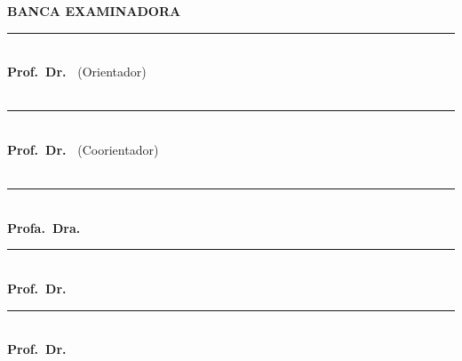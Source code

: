 \begin{center}
    \textbf{BANCA EXAMINADORA}\\

    \vspace{1cm}
    
    \rule{8cm}{0.5pt}\\
    \textbf{Prof.\ Dr.\ \orientador} (Orientador)\\
    \instituicao\ 
    
     \vspace{1cm}
    
    \rule{8cm}{0.5pt}\\
    \textbf{Prof.\ Dr.\ \coorientador} (Coorientador)\\
    \instituicao\ 
    
     \vspace{1cm}
    
    \rule{8cm}{0.5pt}\\
    \textbf{Profa.\ Dra.\ \membroExterno}\\
    \instituicaoExterno
    
     \vspace{1cm}
    
    \rule{8cm}{0.5pt}\\
    \textbf{Prof.\ Dr.\ \membroExternodois}\\
    \instituicaoExternodois
    
     \vspace{1cm}
         
    \rule{8cm}{0.5pt}\\
    \textbf{Prof.\ Dr.\ \membroInterno}\\
    \instituicaoInterno\ 
\end{center}




\vfill




\begin{center}

	\cidade\ \\
     \ano\
\end{center}

\thispagestyle{empty} %

\newpage



